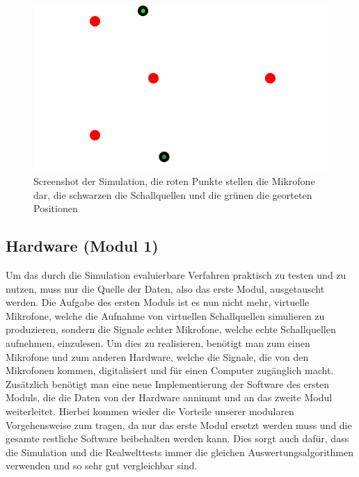 \begin{figure}[H]
  \includegraphics[width=\linewidth]{img/bildsimulation}
  \caption{Screenshot der Simulation, die roten Punkte stellen die Mikrofone dar, die schwarzen die Schallquellen und die grünen die georteten Positionen}
\end{figure}

\subsection{Hardware (Modul 1)}
Um das durch die Simulation evaluierbare Verfahren praktisch zu testen und zu nutzen, muss nur die Quelle der Daten, also das erste Modul, ausgetauscht werden. Die Aufgabe des ersten Moduls ist es nun nicht mehr, virtuelle Mikrofone, welche die Aufnahme von virtuellen Schallquellen simulieren zu produzieren, sondern die Signale echter Mikrofone, welche echte Schallquellen aufnehmen, einzulesen. Um dies zu realisieren, benötigt man zum einen Mikrofone und zum anderen Hardware, welche die Signale, die von den Mikrofonen kommen, digitalisiert und für einen Computer zugänglich macht. Zusätzlich benötigt man eine neue Implementierung der Software des ersten Moduls, die die Daten von der Hardware annimmt und an das zweite Modul weiterleitet. Hierbei kommen wieder die Vorteile unserer modularen Vorgehensweise zum tragen, da nur das erste Modul ersetzt werden muss und die gesamte restliche Software beibehalten werden kann. Dies sorgt auch dafür, dass die Simulation und die Realwelttests immer die gleichen Auswertungsalgorithmen verwenden und so sehr gut vergleichbar sind.

